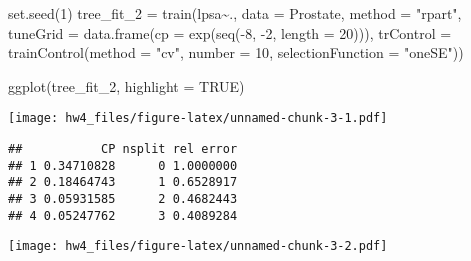 \documentclass[
]{article}
\newenvironment{Shaded}{\begin{snugshade}}{\end{snugshade}}
\newcommand{\AttributeTok}[1]{\textcolor[rgb]{0.77,0.63,0.00}{#1}}
\newcommand{\ConstantTok}[1]{\textcolor[rgb]{0.00,0.00,0.00}{#1}}
\newcommand{\DecValTok}[1]{\textcolor[rgb]{0.00,0.00,0.81}{#1}}
\newcommand{\FunctionTok}[1]{\textcolor[rgb]{0.00,0.00,0.00}{#1}}
\newcommand{\NormalTok}[1]{#1}
\newcommand{\OtherTok}[1]{\textcolor[rgb]{0.56,0.35,0.01}{#1}}
\newcommand{\SpecialCharTok}[1]{\textcolor[rgb]{0.00,0.00,0.00}{#1}}
\newcommand{\StringTok}[1]{\textcolor[rgb]{0.31,0.60,0.02}{#1}}
\begin{document}
\begin{Shaded}
\begin{Highlighting}[]
\FunctionTok{set.seed}\NormalTok{(}\DecValTok{1}\NormalTok{) }
\NormalTok{tree\_fit\_2 }\OtherTok{=} \FunctionTok{train}\NormalTok{(lpsa}\SpecialCharTok{\textasciitilde{}}\NormalTok{.,}
                   \AttributeTok{data =}\NormalTok{ Prostate,}
                   \AttributeTok{method =} \StringTok{"rpart"}\NormalTok{,}
                   \AttributeTok{tuneGrid =} \FunctionTok{data.frame}\NormalTok{(}\AttributeTok{cp =} \FunctionTok{exp}\NormalTok{(}\FunctionTok{seq}\NormalTok{(}\SpecialCharTok{{-}}\DecValTok{8}\NormalTok{, }\SpecialCharTok{{-}}\DecValTok{2}\NormalTok{, }\AttributeTok{length =} \DecValTok{20}\NormalTok{))),}
                   \AttributeTok{trControl =} \FunctionTok{trainControl}\NormalTok{(}\AttributeTok{method =} \StringTok{"cv"}\NormalTok{,}
                                            \AttributeTok{number =} \DecValTok{10}\NormalTok{,}
                                            \AttributeTok{selectionFunction =} \StringTok{"oneSE"}\NormalTok{))}

\FunctionTok{ggplot}\NormalTok{(tree\_fit\_2, }\AttributeTok{highlight =} \ConstantTok{TRUE}\NormalTok{)}
\end{Highlighting}
\end{Shaded}

\texttt{[image: hw4\_files/figure-latex/unnamed-chunk-3-1.pdf]}

\begin{Shaded}
\end{Shaded}

\begin{verbatim}
##           CP nsplit rel error
## 1 0.34710828      0 1.0000000
## 2 0.18464743      1 0.6528917
## 3 0.05931585      2 0.4682443
## 4 0.05247762      3 0.4089284
\end{verbatim}

\begin{Shaded}
\end{Shaded}

\texttt{[image: hw4\_files/figure-latex/unnamed-chunk-3-2.pdf]}
\end{document}
